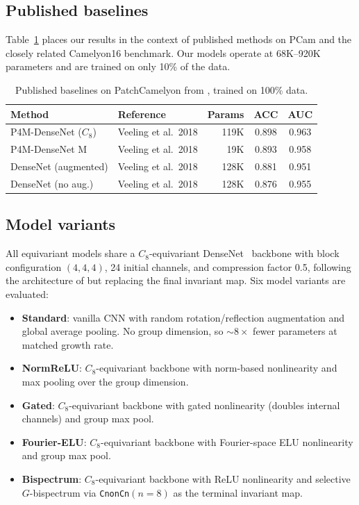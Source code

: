 \documentclass{article}
\theoremstyle{definition}
\theoremstyle{remark}
\theoremstyle{definition}
\begin{document}
\subsection{Published baselines}

Table~\ref{tab:pcam-context} places our results in the context of
published methods on PCam and the closely related Camelyon16
benchmark. Our models operate at 68K--920K parameters and are
trained on only 10\% of the data.

\begin{table}[h]
  \caption{Published baselines on PatchCamelyon from
    \citet{veeling2018rotation}, trained on 100\% data.}
  \label{tab:pcam-context}
  \centering
  \small
  \begin{tabular}{llrcc}
    \toprule
    Method & Reference & Params & ACC & AUC \\
    \midrule
    P4M-DenseNet ($C_8$)  & Veeling et al.\ 2018     & 119K & 0.898 & 0.963 \\
    P4M-DenseNet M        & Veeling et al.\ 2018     &  19K & 0.893 & 0.958 \\
    DenseNet (augmented)   & Veeling et al.\ 2018     & 128K & 0.881 & 0.951 \\
    DenseNet (no aug.)     & Veeling et al.\ 2018     & 128K & 0.876 & 0.955 \\
    \bottomrule
  \end{tabular}
\end{table}

\subsection{Model variants}

All equivariant models share a $C_8$-equivariant
DenseNet~\citep{huang2017densenet} backbone with block configuration
$(4, 4, 4)$, 24 initial channels, and compression factor 0.5,
following the architecture of \citet{veeling2018rotation} but
replacing the final invariant map. Six model variants are evaluated:

\begin{itemize}
  \item \textbf{Standard}: vanilla CNN with random rotation/reflection
    augmentation and global average pooling. No group dimension,
    so ${\sim}8\times$ fewer parameters at matched growth rate.
  \item \textbf{NormReLU}: $C_8$-equivariant backbone with norm-based
    nonlinearity and max pooling over the group dimension.
  \item \textbf{Gated}: $C_8$-equivariant backbone with gated
    nonlinearity (doubles internal channels) and group max pool.
  \item \textbf{Fourier-ELU}: $C_8$-equivariant backbone with
    Fourier-space ELU nonlinearity and group max pool.
  \item \textbf{Bispectrum}: $C_8$-equivariant backbone with ReLU
    nonlinearity and selective $G$-bispectrum via
    \texttt{CnonCn}$(n{=}8)$ as the terminal invariant map.
\end{itemize}
\end{document}

